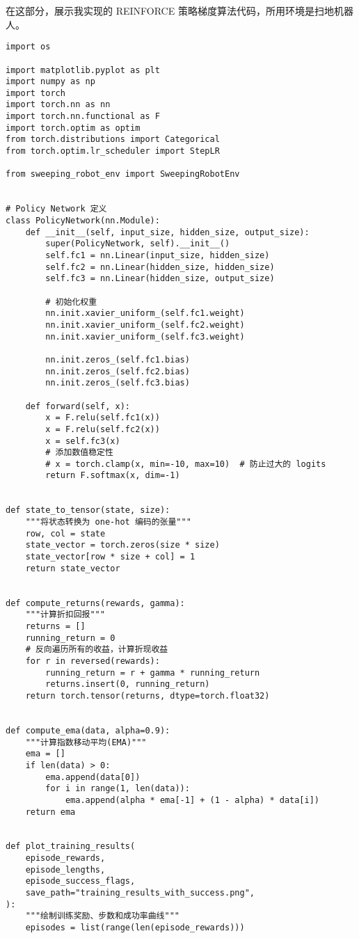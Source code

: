 在这部分，展示我实现的 REINFORCE 策略梯度算法代码，所用环境是扫地机器人。

\begin{verbatim}
import os

import matplotlib.pyplot as plt
import numpy as np
import torch
import torch.nn as nn
import torch.nn.functional as F
import torch.optim as optim
from torch.distributions import Categorical
from torch.optim.lr_scheduler import StepLR

from sweeping_robot_env import SweepingRobotEnv


# Policy Network 定义
class PolicyNetwork(nn.Module):
    def __init__(self, input_size, hidden_size, output_size):
        super(PolicyNetwork, self).__init__()
        self.fc1 = nn.Linear(input_size, hidden_size)
        self.fc2 = nn.Linear(hidden_size, hidden_size)
        self.fc3 = nn.Linear(hidden_size, output_size)

        # 初始化权重
        nn.init.xavier_uniform_(self.fc1.weight)
        nn.init.xavier_uniform_(self.fc2.weight)
        nn.init.xavier_uniform_(self.fc3.weight)

        nn.init.zeros_(self.fc1.bias)
        nn.init.zeros_(self.fc2.bias)
        nn.init.zeros_(self.fc3.bias)

    def forward(self, x):
        x = F.relu(self.fc1(x))
        x = F.relu(self.fc2(x))
        x = self.fc3(x)
        # 添加数值稳定性
        # x = torch.clamp(x, min=-10, max=10)  # 防止过大的 logits
        return F.softmax(x, dim=-1)


def state_to_tensor(state, size):
    """将状态转换为 one-hot 编码的张量"""
    row, col = state
    state_vector = torch.zeros(size * size)
    state_vector[row * size + col] = 1
    return state_vector


def compute_returns(rewards, gamma):
    """计算折扣回报"""
    returns = []
    running_return = 0
    # 反向遍历所有的收益，计算折现收益
    for r in reversed(rewards):
        running_return = r + gamma * running_return
        returns.insert(0, running_return)
    return torch.tensor(returns, dtype=torch.float32)


def compute_ema(data, alpha=0.9):
    """计算指数移动平均(EMA)"""
    ema = []
    if len(data) > 0:
        ema.append(data[0])
        for i in range(1, len(data)):
            ema.append(alpha * ema[-1] + (1 - alpha) * data[i])
    return ema


def plot_training_results(
    episode_rewards,
    episode_lengths,
    episode_success_flags,
    save_path="training_results_with_success.png",
):
    """绘制训练奖励、步数和成功率曲线"""
    episodes = list(range(len(episode_rewards)))


\end{verbatim}
